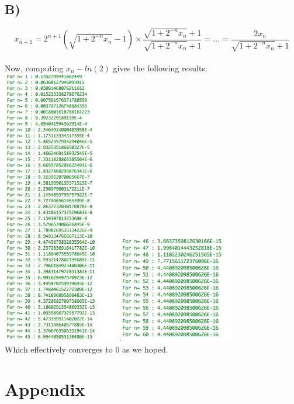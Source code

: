 \documentclass[12pt]{article}
\begin{document}
\subsection{B)}
$$x_{n+1}=2^{n+1}(\sqrt{1+2^{-n}x_n}-1) \times \frac{\sqrt{1+2^{-n}x_n}+1}{\sqrt{1+2^{-n}x_n}+1}=\dots= \frac{2x_n}{\sqrt{1+2^{-n}x_n}+1}$$\\
Now, computing $x_n-ln(2)$ gives the following results:\\
\includegraphics[width=2in]{q2ba}
\includegraphics[width=2in]{q2bb}\\
Which effectively converges to 0 as we hoped. 


\newpage
\section{Appendix}
\end{document}
